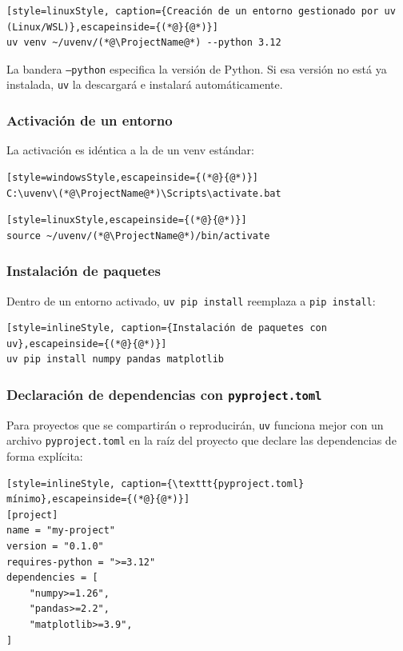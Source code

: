 \begin{lstlisting}[style=linuxStyle, caption={Creación de un entorno gestionado por uv (Linux/WSL)},escapeinside={(*@}{@*)}]
uv venv ~/uvenv/(*@\ProjectName@*) --python 3.12
\end{lstlisting}

La bandera \texttt{--python} especifica la versión de Python. Si esa versión
no está ya instalada, \texttt{uv} la descargará e instalará automáticamente.

\subsubsection{Activación de un entorno}

La activación es idéntica a la de un venv estándar:

\begin{lstlisting}[style=windowsStyle,escapeinside={(*@}{@*)}]
C:\uvenv\(*@\ProjectName@*)\Scripts\activate.bat
\end{lstlisting}

\begin{lstlisting}[style=linuxStyle,escapeinside={(*@}{@*)}]
source ~/uvenv/(*@\ProjectName@*)/bin/activate
\end{lstlisting}

\subsubsection{Instalación de paquetes}

Dentro de un entorno activado, \texttt{uv pip install} reemplaza a
\texttt{pip install}:

\begin{lstlisting}[style=inlineStyle, caption={Instalación de paquetes con uv},escapeinside={(*@}{@*)}]
uv pip install numpy pandas matplotlib
\end{lstlisting}

\subsubsection{Declaración de dependencias con \texttt{pyproject.toml}}

Para proyectos que se compartirán o reproducirán, \texttt{uv} funciona mejor
con un archivo \texttt{pyproject.toml} en la raíz del proyecto que declare
las dependencias de forma explícita:

\begin{lstlisting}[style=inlineStyle, caption={\texttt{pyproject.toml} mínimo},escapeinside={(*@}{@*)}]
[project]
name = "my-project"
version = "0.1.0"
requires-python = ">=3.12"
dependencies = [
    "numpy>=1.26",
    "pandas>=2.2",
    "matplotlib>=3.9",
]
\end{lstlisting}

